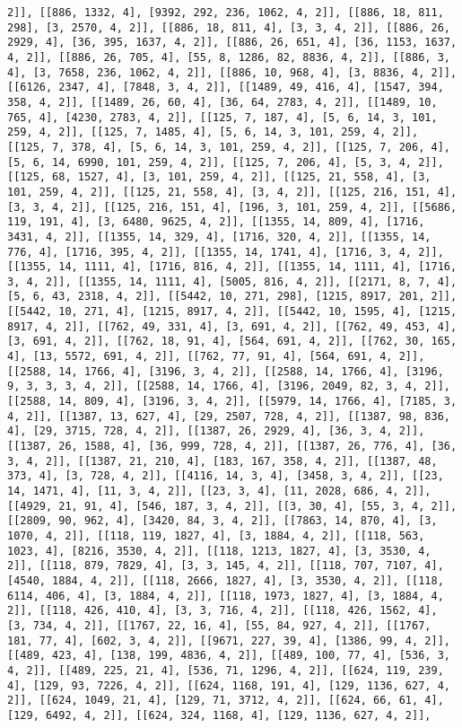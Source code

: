 \documentclass[12pt,fleqn]{article}\usepackage{../../common}
\begin{document}
\begin{verbatim}
2]], [[886, 1332, 4], [9392, 292, 236, 1062, 4, 2]], [[886, 18, 811, 298], [3, 2570, 4, 2]], [[886, 18, 811, 4], [3, 3, 4, 2]], [[886, 26, 2929, 4], [36, 395, 1637, 4, 2]], [[886, 26, 651, 4], [36, 1153, 1637, 4, 2]], [[886, 26, 705, 4], [55, 8, 1286, 82, 8836, 4, 2]], [[886, 3, 4], [3, 7658, 236, 1062, 4, 2]], [[886, 10, 968, 4], [3, 8836, 4, 2]], [[6126, 2347, 4], [7848, 3, 4, 2]], [[1489, 49, 416, 4], [1547, 394, 358, 4, 2]], [[1489, 26, 60, 4], [36, 64, 2783, 4, 2]], [[1489, 10, 765, 4], [4230, 2783, 4, 2]], [[125, 7, 187, 4], [5, 6, 14, 3, 101, 259, 4, 2]], [[125, 7, 1485, 4], [5, 6, 14, 3, 101, 259, 4, 2]], [[125, 7, 378, 4], [5, 6, 14, 3, 101, 259, 4, 2]], [[125, 7, 206, 4], [5, 6, 14, 6990, 101, 259, 4, 2]], [[125, 7, 206, 4], [5, 3, 4, 2]], [[125, 68, 1527, 4], [3, 101, 259, 4, 2]], [[125, 21, 558, 4], [3, 101, 259, 4, 2]], [[125, 21, 558, 4], [3, 4, 2]], [[125, 216, 151, 4], [3, 3, 4, 2]], [[125, 216, 151, 4], [196, 3, 101, 259, 4, 2]], [[5686, 119, 191, 4], [3, 6480, 9625, 4, 2]], [[1355, 14, 809, 4], [1716, 3431, 4, 2]], [[1355, 14, 329, 4], [1716, 320, 4, 2]], [[1355, 14, 776, 4], [1716, 395, 4, 2]], [[1355, 14, 1741, 4], [1716, 3, 4, 2]], [[1355, 14, 1111, 4], [1716, 816, 4, 2]], [[1355, 14, 1111, 4], [1716, 3, 4, 2]], [[1355, 14, 1111, 4], [5005, 816, 4, 2]], [[2171, 8, 7, 4], [5, 6, 43, 2318, 4, 2]], [[5442, 10, 271, 298], [1215, 8917, 201, 2]], [[5442, 10, 271, 4], [1215, 8917, 4, 2]], [[5442, 10, 1595, 4], [1215, 8917, 4, 2]], [[762, 49, 331, 4], [3, 691, 4, 2]], [[762, 49, 453, 4], [3, 691, 4, 2]], [[762, 18, 91, 4], [564, 691, 4, 2]], [[762, 30, 165, 4], [13, 5572, 691, 4, 2]], [[762, 77, 91, 4], [564, 691, 4, 2]], [[2588, 14, 1766, 4], [3196, 3, 4, 2]], [[2588, 14, 1766, 4], [3196, 9, 3, 3, 3, 4, 2]], [[2588, 14, 1766, 4], [3196, 2049, 82, 3, 4, 2]], [[2588, 14, 809, 4], [3196, 3, 4, 2]], [[5979, 14, 1766, 4], [7185, 3, 4, 2]], [[1387, 13, 627, 4], [29, 2507, 728, 4, 2]], [[1387, 98, 836, 4], [29, 3715, 728, 4, 2]], [[1387, 26, 2929, 4], [36, 3, 4, 2]], [[1387, 26, 1588, 4], [36, 999, 728, 4, 2]], [[1387, 26, 776, 4], [36, 3, 4, 2]], [[1387, 21, 210, 4], [183, 167, 358, 4, 2]], [[1387, 48, 373, 4], [3, 728, 4, 2]], [[4116, 14, 3, 4], [3458, 3, 4, 2]], [[23, 14, 1471, 4], [11, 3, 4, 2]], [[23, 3, 4], [11, 2028, 686, 4, 2]], [[4929, 21, 91, 4], [546, 187, 3, 4, 2]], [[3, 30, 4], [55, 3, 4, 2]], [[2809, 90, 962, 4], [3420, 84, 3, 4, 2]], [[7863, 14, 870, 4], [3, 1070, 4, 2]], [[118, 119, 1827, 4], [3, 1884, 4, 2]], [[118, 563, 1023, 4], [8216, 3530, 4, 2]], [[118, 1213, 1827, 4], [3, 3530, 4, 2]], [[118, 879, 7829, 4], [3, 3, 145, 4, 2]], [[118, 707, 7107, 4], [4540, 1884, 4, 2]], [[118, 2666, 1827, 4], [3, 3530, 4, 2]], [[118, 6114, 406, 4], [3, 1884, 4, 2]], [[118, 1973, 1827, 4], [3, 1884, 4, 2]], [[118, 426, 410, 4], [3, 3, 716, 4, 2]], [[118, 426, 1562, 4], [3, 734, 4, 2]], [[1767, 22, 16, 4], [55, 84, 927, 4, 2]], [[1767, 181, 77, 4], [602, 3, 4, 2]], [[9671, 227, 39, 4], [1386, 99, 4, 2]], [[489, 423, 4], [138, 199, 4836, 4, 2]], [[489, 100, 77, 4], [536, 3, 4, 2]], [[489, 225, 21, 4], [536, 71, 1296, 4, 2]], [[624, 119, 239, 4], [129, 93, 7226, 4, 2]], [[624, 1168, 191, 4], [129, 1136, 627, 4, 2]], [[624, 1049, 21, 4], [129, 71, 3712, 4, 2]], [[624, 66, 61, 4], [129, 6492, 4, 2]], [[624, 324, 1168, 4], [129, 1136, 627, 4, 2]], 
\end{verbatim}
\end{document}
